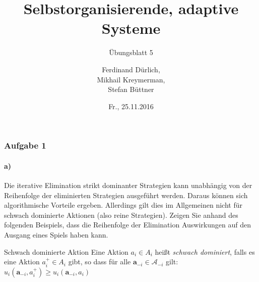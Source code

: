 \documentclass{beamer}
\title[SOAS]{Selbstorganisierende, adaptive Systeme}
\subtitle{Übungsblatt 5}
\author[Ferdinand, Mikhail, Stefan]{ %
Ferdinand Dürlich, \\
Mikhail Kreymerman, \\
Stefan Büttner
}
\institute[ISSE]{ %
Institut for Software \& Systems Engineering\\
Universität Augsburg
}
\date{Fr., 25.11.2016}
\begin{document}
\frame{\titlepage}

\begin{frame}
	\frametitle{Aufgabe 1}
	\framesubtitle{a)}
	Die iterative Elimination strikt dominanter Strategien kann unabhängig von der Reihenfolge
	der eliminierten Strategien ausgeführt werden. Daraus können sich algorithmische Vorteile
	ergeben. Allerdings gilt dies im Allgemeinen nicht für schwach dominierte Aktionen (also reine Strategien). Zeigen Sie anhand des folgenden Beispiels, dass die Reihenfolge der Elimination Auswirkungen auf den Ausgang eines Spiels haben kann.
	
	\begin{block}{Schwach dominierte Aktion}
		Eine Aktion $a_i \in A_i$ heißt \textit{schwach dominiert}, falls es eine Aktion $a^+_i \in A_i$ gibt, so dass für
		alle $\mathbf{a}_{-i} \in \mathcal{A}_{-i}$ gilt:\\
		\centering
		$u_i(\mathbf{a}_{-i}, a^+_i) \ge u_i(\mathbf{a}_{-i}, a_i)$
	\end{block}
\end{frame}	
\end{document}
